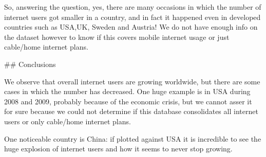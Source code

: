 \documentclass[11pt]{article}
\begin{document}
    So, answering the question, yes, there are many occasions in which the
number of internet users got smaller in a country, and in fact it
happened even in developed countries such as USA,UK, Sweden and Austria!
We do not have enough info on the dataset however to know if this covers
mobile internet usage or just cable/home internet plans.

     \#\# Conclusions

We observe that overall internet users are growing worldwide, but there
are some cases in which the number has decreased. One huge example is in
USA during 2008 and 2009, probably because of the economic crisis, but
we cannot asser it for sure because we could not determine if this
database consolidates all internet users or only cable/home internet
plans.

One noticeable country is China: if plotted against USA it is incredible
to see the huge explosion of internet users and how it seems to never
stop growing.


    
    
    
    
\end{document}
